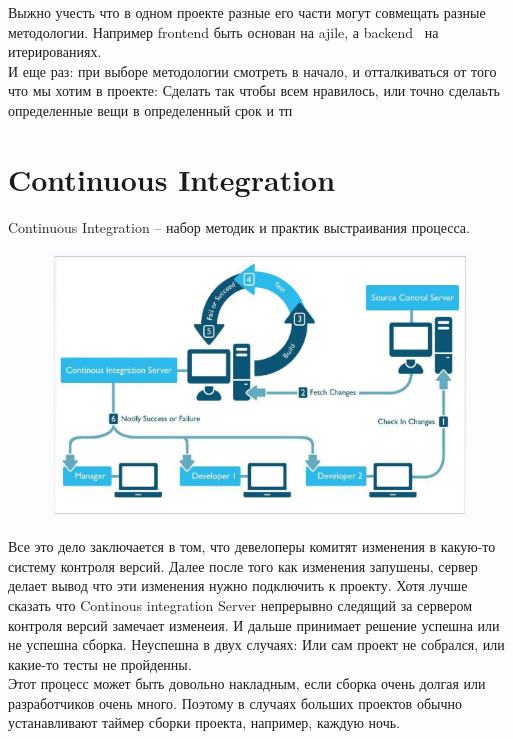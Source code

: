 \documentclass[12pt; a4paper]{book}
\theoremstyle{plain} %
\theoremstyle{defenition}
\theoremstyle{remark}
\begin{document}
 Выжно учесть что в одном проекте разные его части могут совмещать разные методологии. Например frontend быть основан на ajile, а backend  на итерированиях.\\
 И еще раз: при выборе методологии смотреть в начало, и отталкиваться от того что мы хотим в проекте: Сделать так чтобы всем нравилось, или точно сделаьть определенные вещи в определенный срок и тп

\newpage
\section{Continuous Integration}
 Continuous Integration -- набор методик и практик выстраивания процесса.
\begin{figure}[!htbp]
\includegraphics[angle=0, width=\textwidth]{IMG/16} \\
\end{figure}
Все это дело заключается в том, что девелоперы комитят изменения в какую-то систему контроля версий.
Далее после того как изменения запушены, сервер делает вывод что эти изменения нужно подключить к проекту. Хотя лучше сказать что Continous integration Server непрерывно следящий за сервером контроля версий замечает изменеия. И дальше принимает решение успешна или не успешна сборка. Неуспешна в двух случаях: Или сам проект не собрался, или какие-то тесты не пройденны.\\
Этот процесс может быть довольно накладным, если сборка очень долгая или разработчиков очень много. Поэтому в случаях больших проектов обычно устанавливают таймер сборки проекта, например, каждую ночь.
\end{document}
